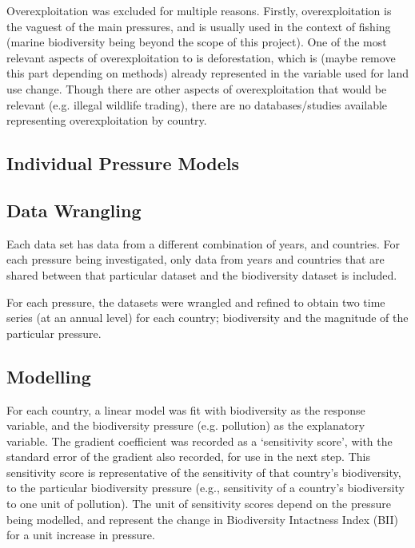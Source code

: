 \documentclass[11pt, a4paper, titlepage]{article}
\begin{document}
	Overexploitation was excluded for multiple reasons. Firstly, overexploitation is the vaguest of the main pressures, and is usually used in the context of fishing (marine biodiversity being beyond the scope of this project). One of the most relevant aspects of overexploitation to is deforestation, which is (maybe remove this part depending on methods) already represented in the variable used for land use change. Though there are other aspects of overexploitation that would be relevant (e.g. illegal wildlife trading), there are no databases/studies available representing overexploitation by country.



	\subsection*{Individual Pressure Models}
	
	\subsection*{Data Wrangling}
	
	Each data set has data from a different combination of years, and countries. For each pressure being investigated, only data from years and countries that are shared between that particular dataset and the biodiversity dataset is included. \newline
	
	For each pressure, the datasets were wrangled and refined to obtain two time series (at an annual level) for each country; biodiversity and the magnitude of the particular pressure.
	
	\subsection*{Modelling}
	
	For each country, a linear model was fit with biodiversity as the response variable, and the biodiversity pressure (e.g. pollution) as the explanatory variable. The gradient coefficient was recorded as a `sensitivity score', with the standard error of the gradient also recorded, for use in the next step. This sensitivity score is representative of the sensitivity of that country's biodiversity, to the particular biodiversity pressure (e.g., sensitivity of a country's biodiversity to one unit of pollution). The unit of sensitivity scores depend on the pressure being modelled, and represent the change in Biodiversity Intactness Index (BII) for a unit increase in pressure. \newline
	
\end{document}
